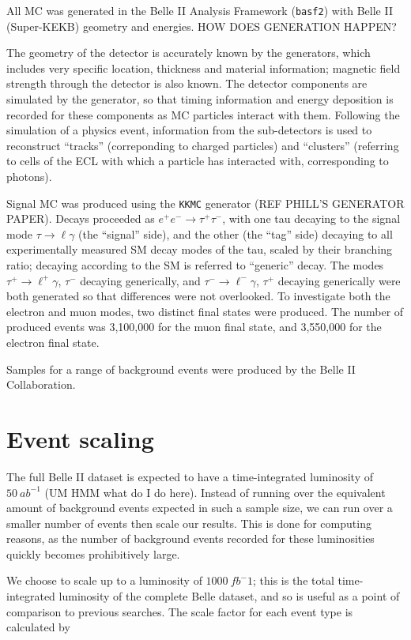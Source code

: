 \documentclass[12pt]{thesis}  %
\begin{document}
All MC was generated in the Belle II Analysis Framework (\texttt{basf2}) with Belle II (Super-KEKB) geometry and energies. HOW DOES GENERATION HAPPEN? 

The geometry of the detector is accurately known by the generators, which includes very specific location, thickness and material information; magnetic field strength through the detector is also known. The detector components are simulated by the generator, so that timing information and energy deposition is recorded for these components as MC particles interact with them. Following the simulation of a physics event, information from the sub-detectors is used to reconstruct ``tracks'' (correponding to charged particles) and ``clusters'' (referring to cells of the ECL with which a particle has interacted with, corresponding to photons).

Signal MC was produced using the \texttt{KKMC} generator (REF PHILL'S GENERATOR PAPER). Decays proceeded as $e^+ e^- \to \tau^+ \tau^-$, with one tau decaying to the signal mode $\tau \to \ell \gamma$ (the ``signal'' side), and the other (the ``tag'' side) decaying to all experimentally measured SM decay modes of the tau, scaled by their branching ratio; decaying according to the SM is referred to ``generic'' decay. The modes $\tau^+ \to \ell^+ \gamma$, $\tau^-$ decaying generically, and $\tau^- \to \ell^- \gamma$, $\tau^+$ decaying generically were both generated so that differences were not overlooked. To investigate both the electron and muon modes, two distinct final states were produced. The number of produced events was 3,100,000 for the muon final state, and 3,550,000 for the electron final state.

Samples for a range of background events were produced by the Belle II Collaboration. 


\section{Event scaling}

The full Belle II dataset is expected to have a time-integrated luminosity of $\SI{50}{ab^{-1}}$ (UM HMM what do I do here). Instead of running over the equivalent amount of background events expected in such a sample size, we can run over a smaller number of events then scale our results. This is done for computing reasons, as the number of background events recorded for these luminosities quickly becomes prohibitively large.

We choose to scale up to a luminosity of $\SI{1000}{fb^-1}$; this is the total time-integrated luminosity of the complete Belle dataset, and so is useful as a point of comparison to previous searches. The scale factor for each event type is calculated by
\end{document}
